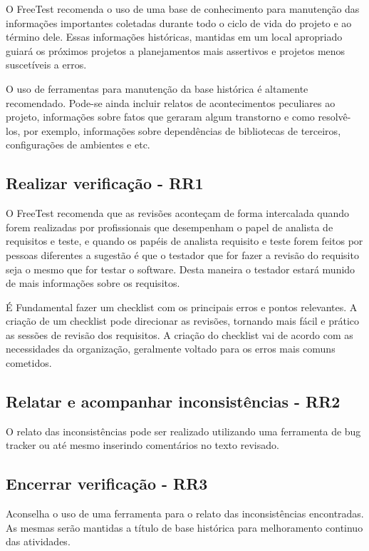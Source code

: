 O FreeTest recomenda o uso de uma base de conhecimento para manutenção das informações importantes coletadas durante todo o ciclo de vida do projeto e ao término dele. Essas informações históricas, mantidas em um local apropriado guiará os próximos projetos a planejamentos mais assertivos e projetos menos suscetíveis a erros.

O uso de ferramentas para manutenção da base histórica é altamente recomendado. Pode-se ainda incluir relatos de acontecimentos peculiares ao projeto, informações sobre fatos que geraram algum transtorno e como resolvê-los, por exemplo, informações sobre dependências de bibliotecas de terceiros, configurações de ambientes e etc.

\subsection{Realizar verificação - RR1}
\label{sec:guiarr1}

O FreeTest recomenda que as revisões aconteçam de forma intercalada quando forem realizadas por profissionais que desempenham o papel de analista de requisitos e teste, e quando os papéis de analista requisito e teste forem feitos por pessoas diferentes a sugestão é que o testador que for fazer a revisão do requisito seja o mesmo que for testar o software. Desta maneira o testador estará munido de mais informações sobre os requisitos.

É Fundamental fazer um checklist com os principais erros e pontos relevantes. A criação de um checklist pode direcionar as revisões, tornando mais fácil e prático as sessões de revisão dos requisitos. A criação do checklist vai de acordo com as necessidades da organização, geralmente voltado para os erros mais comuns cometidos.

\subsection{Relatar e acompanhar inconsistências - RR2}
\label{sec:guiarr2}

O relato das inconsistências pode ser realizado utilizando uma ferramenta de bug tracker ou até mesmo inserindo comentários no texto revisado.

\subsection{Encerrar verificação - RR3}
\label{sec:guiarr3}

Aconselha o uso de uma ferramenta para o relato das inconsistências encontradas. As mesmas serão mantidas a título de base histórica para melhoramento continuo das atividades.


